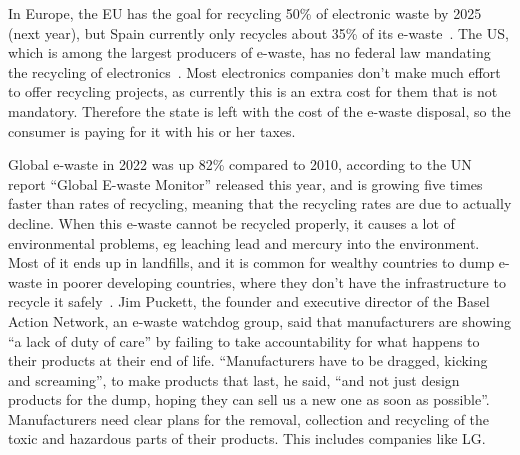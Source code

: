 \documentclass[12pt, letterpaper]{article}
\begin{document}
In Europe, the EU has the goal for recycling 50\% of electronic waste
by 2025 (next year), but Spain currently only recycles about 35\% of
its e-waste~\autocite{miogas-2024}. The US, which is among the
largest producers of e-waste, has no federal law mandating the
recycling of electronics~\autocite{ramirez-2024}. Most electronics
companies don't make much
effort to offer recycling
projects, as currently this is an extra cost for them that is not
mandatory. Therefore the state is left with the cost of the e-waste
disposal, so the consumer is paying for it with his or her taxes.

Global e-waste in 2022 was up 82\% compared to 2010, according to the
UN report ``Global E-waste Monitor'' released this year, and is
growing five times faster than rates of recycling, meaning that the
recycling rates are due to actually decline. When this e-waste
cannot be recycled properly, it causes a lot of environmental
problems, eg leaching lead and mercury into the environment. Most of
it ends up in landfills, and it is common for wealthy countries to
dump e-waste in poorer developing countries, where they don't have
the infrastructure to recycle it safely~\autocite{ramirez-2024}.
Jim Puckett, the founder and executive director of the Basel Action
Network, an e-waste watchdog group, said that manufacturers are
showing ``a lack of duty of care'' by failing to take accountability
for what happens to their products at their end of life.
``Manufacturers have to be dragged, kicking and screaming'', to make
products that last, he said, ``and not just design products for the
dump, hoping they can sell us a new one as soon as possible''.
Manufacturers need clear plans for the removal, collection and
recycling of the toxic and hazardous parts of their products. This
includes companies like LG.\@

\printbibliography[heading=bibintoc,title=References]
\end{document}
